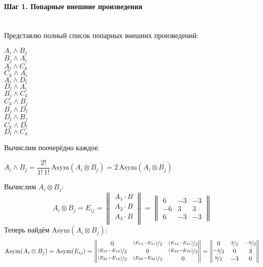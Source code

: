 \documentclass{article}
\begin{document}
\paragraph*{Шаг 1. Попарные внешние произведения} \, \\
Представлю полный список попарных внешних произведений:
\begin{multicols}{4}
\noindent $A_i \wedge B_j$ \\
$B_j \wedge A_i$ \\
$A_i \wedge C_k$ \\
$C_k \wedge A_i$ \\
$A_i \wedge D_l$ \\
$D_l \wedge A_i$ \\
$B_j \wedge C_k$ \\
$C_k \wedge B_j$ \\
$B_j \wedge D_l$ \\
$D_l \wedge B_j$ \\
$C_k \wedge D_l$ \\
$D_l \wedge C_k$
\end{multicols}
\noindent Вычислим поочерёдно каждое.
\begin{center}
$A_i \wedge B_j = \dfrac{2!}{1!\,1!}\,\text{Asym}(A_i\otimes B_j) = 2\,\text{Asym}(A_i\otimes B_j)$
\end{center}
Вычислим $A_i\otimes B_j$:
$$A_i\otimes B_j = E_{ij} = \begin{Vmatrix}
A_1 \cdot B \\
A_2 \cdot B \\
A_3 \cdot B \\
\end{Vmatrix} = \begin{Vmatrix}
6 & -3 & -3 \\
-6 & 3 & 3 \\
6 & -3 & -3
\end{Vmatrix}$$
Теперь найдём $\text{Asym}(A_i\otimes B_j)$:
$$\text{Asym}(A_i\otimes B_j) = \text{Asym}(E_{ij}) = \begin{Vmatrix}
0 & \nicefrac{(E_{12} - E_{21})}{2} & \nicefrac{(E_{13} - E_{31})}{2} \\
\nicefrac{(E_{21} - E_{12})}{2} & 0 & \nicefrac{(E_{23} - E_{32})}{2} \\
\nicefrac{(E_{31} - E_{13})}{2} & \nicefrac{(E_{32} - E_{23})}{2} & 0
\end{Vmatrix} = \begin{Vmatrix}
0 & \nicefrac{3}{2} & \nicefrac{-9}{2} \\
\nicefrac{-3}{2} & 0 & 3 \\
\nicefrac{9}{2} & -3 & 0
\end{Vmatrix}$$
\end{document}
